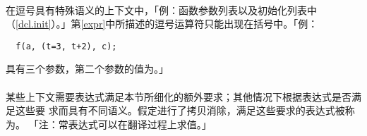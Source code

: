\paragraph{}
在逗号具有特殊语义的上下文中，「例：函数参数列表以及初始化列表中
（\ref{dcl.init}）。」第\ref{expr}中所描述的逗号运算符只能出现在括号中。「例：
\begin{lstlisting}
  f(a, (t=3, t+2), c);
\end{lstlisting}
具有三个参数，第二个参数的值为。」

\paragraph{}
某些上下文需要表达式满足本节所细化的额外要求；其他情况下根据表达式是否满足这些要
求而具有不同语义。假定进行了拷贝消除，满足这些要求的表达式被称为。
「注：常表达式可以在翻译过程上求值。」



